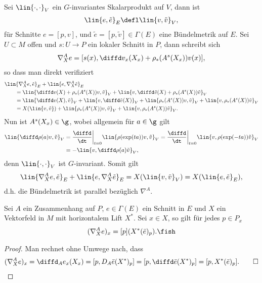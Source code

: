\documentclass[%
	paper=a5,%
	fleqn,%
	DIV=18,%
	BCOR=0mm,
	fontsize=11pt,
	titlepage=false,%
	bibliography=totoc,
	DIV=18,%
	twoside=true,
	pdftitle=Riemannsche Geometrie,
	pdfauthor=Uwe Semmelmann,
	numbers=noendperiod]%
	{scrbook}
\begin{document}
\begin{rem}
Sei $\lin{\cdot,\cdot}_V$ ein $G$-invariantes Skalarprodukt auf $V$, dann ist
\begin{align*}
\lin{e,\tilde{e}}_E\defl  \lin{v,\tilde{v}}_V,
\end{align*}
für Schnitte $e = [p,v]$, und $\tilde{e}=[p,\tilde{v}]\in\Gamma(E)$
eine Bündelmetrik auf $E$. Sei $U\subset M$ offen und $s: U\to P$ ein lokaler
Schnitt in $P$, dann schreibt sich
\begin{align*}
\nabla_X^A e = [s(x),\diffd v_x(X_x) + \rho_*(A^s(X_x))v(x)],
\end{align*}
so dass man direkt verifiziert
\begin{align*}
&\lin{\nabla_X^A e,\tilde{e}}_E + \lin{e,\nabla_X^A \tilde{e}}_E \\ 
&\qquad = 
\lin{\diffd v(X) + \rho_*(A^s(X))v,\tilde{v}}_V + \lin{v,\diffd\tilde{v}(X) +
\rho_*(A^s(X))\tilde{v}}_V\\
&\qquad=
\lin{\diffd v(X),\tilde{v}}_V + 
\lin{v,\diffd \tilde{v}(X)}_V +
\lin{\rho_*(A^s(X))v,\tilde{v}}_V + \lin{v,\rho_*(A^s(X))\tilde{v}}_V\\
&\qquad=
X(\lin{v,\tilde{v}}) + \lin{\rho_*(A^s(X))v,\tilde{v}}_V +
\lin{v,\rho_*(A^s(X))\tilde{v}}_V.
\end{align*}
Nun ist $A^s(X_x)\in \g$, wobei allgemein für $a\in\g$ gilt
\begin{align*}
\lin{\diffd\rho(a)v,\tilde{v}}_V &= 
\frac{\diffd}{\dt}\bigg|_{t=0} \lin{\rho(\exp(ta))v,\tilde{v}}_V
=
\frac{\diffd}{\dt}\bigg|_{t=0} \lin{v,\rho(\exp(-ta))\tilde{v}}_V\\
&=
-\lin{v,\diffd\rho(a)\tilde{v}}_V,
\end{align*}
denn $\lin{\cdot,\cdot}_V$ ist $G$-invariant. Somit gilt
\begin{align*}
\lin{\nabla_X^A e,\tilde{e}}_E + \lin{e,\nabla_X^A \tilde{e}}_E = 
X(\lin{v,\tilde{v}}_V) = 
X(\lin{e,\tilde{e}}_E),
\end{align*}
d.h. die Bündelmetrik ist parallel bezüglich $\nabla^A$.\map
\end{rem}

\begin{lem}
Sei $A$ ein Zusammenhang auf $P$, $e\in \Gamma(E)$ ein Schnitt in $E$ und $X$
ein Vektorfeld in $M$ mit horizontalem Lift $X^*$. Sei $x\in X$, so gilt für
jedes $p\in P_x$
\begin{align*}
(\nabla_X^A e)_x = [p](X^*(\bar{e})_p).\fish
\end{align*} 
\end{lem}
\begin{proof}
Man rechnet ohne Umwege nach, dass
\begin{align*}
(\nabla_X^A e)_x = \diffd_A e_x(X_x) = 
[p,D_A \bar{e}(X^*)_p]
=
[p,\diffd \bar{e}(X^*)_p]
= [p,X^*(\bar{e})_p].\qed
\end{align*}
\end{proof}
\end{document}
